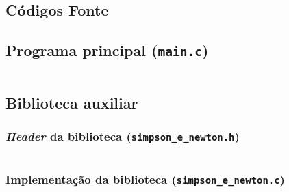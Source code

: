 \begin{apendicesenv}

\partapendices

\chapter{Códigos Fonte}
\label{ch:codigos_fonte}
	\section{Programa principal (\texttt{main.c})}
		\label{sec:main.c}
		\inputminted[autogobble,breaklines,linenos,frame=lines,tabsize=4,obeytabs=true,fontsize=\footnotesize
		]{c}{source_codes/main.c}

	\section{Biblioteca auxiliar}
		\subsection{\emph{Header} da biblioteca (\texttt{simpson\_e\_newton.h})}
		\label{sec:simpson_composta.h}
			\inputminted[autogobble,breaklines,linenos,frame=lines,tabsize=4,obeytabs=true,fontsize=\footnotesize
			]{c}{source_codes/simpson_e_newton.h}

		\subsection{Implementação da biblioteca (\texttt{simpson\_e\_newton.c})}
			\label{sec:simpson_composta.c}
			\inputminted[autogobble,breaklines,linenos,frame=lines,tabsize=4,obeytabs=true,fontsize=\footnotesize
			]{c}{source_codes/simpson_e_newton.c}

\end{apendicesenv}
